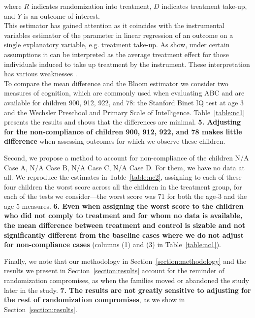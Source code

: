 \begin{appendices}
\noindent where $R$ indicates randomization into treatment, $D$ indicates treatment take-up, and $Y$ is an outcome of interest.\\

\noindent This estimator has gained attention as it coincides with the instrumental variables estimator of the parameter in linear regression of an outcome on a single explanatory variable, e.g. treatment take-up. As \citet{Angrist_Imbens_ea_1996_JASA} show, under certain assumptions it can be interpreted as the average treatment effect for those individuals induced to take up treatment by the instrument. These interpretation has various weaknesses \citep{Heckman_Urzua_2010_JoE,Heckman_Urzua_etal_2006_REStat}.\\

\noindent To compare the mean difference and the Bloom estimator we consider two measures of cognition, which are commonly used when evaluating ABC and are available for children 900, 912, 922, and 78: the Stanford Binet IQ test at age 3 and the Wechsler Preschool and Primary Scale of Intelligence. Table~\ref{table:nc1} presents the results and shows that the differences are minimal. \textbf{5. Adjusting for the non-compliance of children 900, 912, 922, and 78 makes little difference} when assessing outcomes for which we observe these children. 



\noindent Second, we propose a method to account for non-compliance of the children N/A Case A, N/A Case B, N/A Case C, N/A Case D. For them, we have no data at all. We reproduce the estimates in Table~\ref{table:nc2}, assigning to each of these four children the worst score across all the children in the treatment group, for each of the tests we consider---the worst score was 71 for both the age-3 and the age-5 measures. \textbf{6. Even when assigning the worst score to the children who did not comply to treatment and for whom no data is available, the mean difference between treatment and control is sizable and not significantly different from the baseline cases where we do not adjust for non-compliance cases} (columns (1) and (3) in Table~\ref{table:nc1}).



\noindent Finally, we note that our methodology in Section~\ref{section:methodology} and the results we present in Section~\ref{section:results} account for the reminder of randomization compromises, as when the families moved or abandoned the study later in the study. \textbf{7. The results are not greatly sensitive to adjusting for the rest of randomization compromises}, as we show in Section~\ref{section:results}.

\end{appendices}

\renewcommand{\refname}{Appendix References}
\clearpage
\singlespace



 
